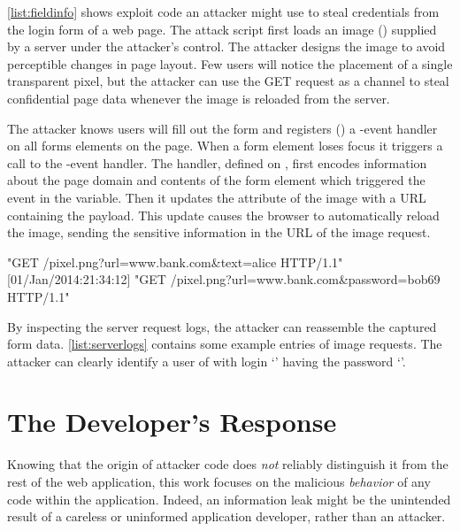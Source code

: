\autoref{list:fieldinfo} shows exploit code an attacker might use to steal credentials from the login form of a web page.
The attack script first loads an image () supplied by a server under the attacker's control.
The attacker designs the image to avoid perceptible changes in page layout.
Few users will notice the placement of a single transparent pixel, but the attacker can use the GET request as a channel to steal confidential page data whenever the image is reloaded from the server.

The attacker knows users will fill out the form and registers () a -event handler on all forms elements on the page.
When a form element loses focus it triggers a call to the -event handler.
The handler,  defined on , first encodes information about the page domain and contents of the form element which triggered the event in the  variable.
Then it updates the  attribute of the image with a URL containing the payload.
This update causes the browser to automatically reload the image, sending the sensitive information in the URL of the image request.

\begin{jscode}
[01/Jan/2014:21:34:10] "GET /pixel.png?url=www.bank.com&text=alice HTTP/1.1"
[01/Jan/2014:21:34:12] "GET /pixel.png?url=www.bank.com&password=bob69 HTTP/1.1"
\end{jscode}

By inspecting the server request logs, the attacker can reassemble the captured form data.
\autoref{list:serverlogs} contains some example entries of image requests.
The attacker can clearly identify a user of  with login `' having the password `'.

\section{The Developer's Response}\label{sec:developers-response}

Knowing that the origin of attacker code does \emph{not} reliably distinguish it from the rest of the web application, this work focuses on the malicious \emph{behavior} of any code within the application.
Indeed, an information leak might be the unintended result of a careless or uninformed application developer, rather than an attacker.

